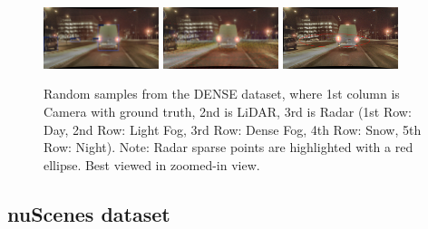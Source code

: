 \documentclass[report.tex]{subfiles}
\begin{document}
\begin{figure}[ht!]
            \includegraphics[width=0.3\textwidth]{images/datasets/dense/samples/night/2018-02-09_18-50-50_00300.png}\hfill
            \includegraphics[width=0.3\textwidth]{images/datasets/dense/samples/night/night_LiDAR.png}\hfill
            \includegraphics[width=0.3\textwidth]{images/datasets/dense/samples/night/night_Radar_ann.png}
          
            \caption{Random samples from the DENSE dataset, where 1st column is Camera with ground truth, 2nd is LiDAR, 3rd is Radar (1st Row: Day, 2nd Row: Light Fog, 3rd Row: Dense Fog, 4th Row: Snow, 5th Row: Night). Note: Radar sparse points are highlighted with a red ellipse. Best viewed in zoomed-in view.}
            \label{fig:dense_samples}
          \end{figure}
          


    \subsection{nuScenes dataset}
    \label{subsec:nuscenes_dataset}

\end{document}
